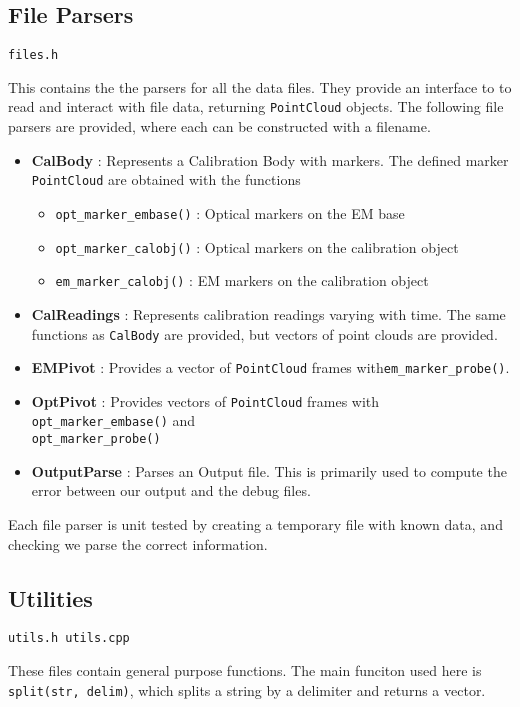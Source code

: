 \documentclass[letterpaper, 11pt]{report}
\begin{document}
\subsection{File Parsers}
\begin{verbatim}
files.h
\end{verbatim}
This contains the the parsers for all the data files. They provide an interface to to read and interact with file data, returning \texttt{PointCloud} objects. The following file parsers are provided, where each can be constructed with a filename.
\begin{itemize}
\item \textbf{CalBody} : Represents a Calibration Body with markers. The defined marker \texttt{PointCloud} are obtained with the functions
\begin{itemize}
\item \texttt{opt\_marker\_embase()} : Optical markers on the EM base
\item \texttt{opt\_marker\_calobj()} : Optical markers on the calibration object
\item \texttt{em\_marker\_calobj()} : EM markers on the calibration object
\end{itemize}
\item \textbf{CalReadings} : Represents calibration readings varying with time. The same functions as \texttt{CalBody} are provided, but vectors of point clouds are provided.
\item \textbf{EMPivot} : Provides a vector of \texttt{PointCloud} frames with\texttt{em\_marker\_probe()}.
\item \textbf{OptPivot} : Provides vectors of \texttt{PointCloud} frames with \texttt{opt\_marker\_embase()} and \\ \texttt{opt\_marker\_probe()}
\item \textbf{OutputParse} : Parses an Output file. This is primarily used to compute the error between our output and the debug files.
\end{itemize}
Each file parser is unit tested by creating a temporary file with known data, and checking we parse the correct information.
\subsection{Utilities}
\begin{verbatim}
utils.h utils.cpp
\end{verbatim}
These files contain general purpose functions. The main funciton used here is \texttt{split(str, delim)}, which splits a string by a delimiter and returns a vector.
\end{document}

